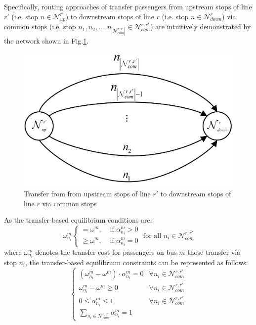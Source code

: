 \documentclass[smallextended]{svjour3}       %
\begin{document}
\begin{Abstract}
Specifically, routing approaches of transfer passengers
from upstream stops of line $r'$ (i.e. stop $n\in\mathcal{N}_{up}^{r'}$) 
to downstream stops of line $r$ (i.e. stop $n \in \mathcal{N}_{down}^{r}$) 
via common stops (i.e. stop $n_{1},n_{2},...,n_{\left|\mathcal{N}_{com}^{r,r'}\right|}\in \mathcal{N}_{com}^{r,r'}$)
are intuitively demonstrated by the network shown in \textup{Fig.\ref{transfer choice network}}. 
\begin{figure}[H]
    \centering
    \includegraphics[width=0.5\linewidth]{CASPT2021paper_fig/transfer choice network.png}
    \caption{Transfer from from upstream stops of line $r'$ to downstream stops of line $r$ via common stops}
    \label{transfer choice network}
\end{figure}
As the transfer-based equilibrium conditions are:
\begin{equation}
    \omega_{n_{i}}^{m}
    \begin{cases}
        =\omega^{m},&\text{ if } \alpha_{n_{i}}^{m}>0\\
        \geq \omega^{m},&\text{ if } \alpha_{n_{i}}^{m}=0
    \end{cases}
    \text{ for all } n_{i} \in \mathcal{N}_{com}^{r,r'}
\end{equation}
where $\omega_{n_{i}}^{m}$ denotes the transfer cost for passengers on bus $m$ those transfer via stop $n_{i}$,
the transfer-based equilibrium constraints can be represented as follows:
\begin{equation}
    \begin{cases}
        \left(\omega_{n_{i}}^{m}-\omega^{m}\right)\cdot \alpha_{n_{i}}^{m} = 0 &\forall n_{i}\in \mathcal{N}_{com}^{r,r'}\\
        \omega_{n_{i}}^{m}-\omega^{m} \geq 0 &\forall n_{i}\in \mathcal{N}_{com}^{r,r'}\\
        0 \leq \alpha_{n_{i}}^{m} \leq 1 &\forall n_{i}\in \mathcal{N}_{com}^{r,r'}\\
        \sum\limits_{n_{i}\in \mathcal{N}_{com}^{r,r'}} \alpha_{n_{i}}^{m} = 1
    \end{cases}
\end{equation}


\end{Abstract}
\end{document}
